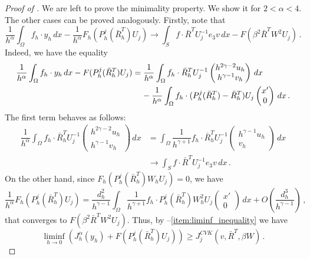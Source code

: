 \documentclass{article}
\theoremstyle{plain}
\theoremstyle{plain}
\theoremstyle{plain}
\theoremstyle{plain}
\theoremstyle{plain}
\theoremstyle{definition}
\theoremstyle{definition}
\begin{document}
\begin{proof}[Proof of ]
	We are left to prove the minimality property. We show it for $2 < \alpha < 4$. The other cases can be proved analogously. Firstly, note that 
	\begin{equation}\label{eq:convergence_force_term}
		\dfrac{1}{h^\alpha}\int_\Omega f_h \cdot y_h \, dx - \dfrac{1}{h^\alpha}F_h(P_h^j(\bar R_h^T)U_j) \to \int_S f \cdot \bar R^T U_j^{-1} e_3 v \, dx - F(\beta^2\bar R^TW^2U_j) \,.
	\end{equation}
	Indeed, we have the equality
	\begin{equation}
		\begin{aligned}
			\dfrac{1}{h^\alpha}\int_\Omega f_h \cdot y_h \, dx - F(P_h^j(\bar R_h^T)U_j) & = \dfrac{1}{h^\alpha} \int_\Omega f_h \cdot \bar R_h^TU_j^{-1}\begin{pmatrix}
			h^{2\gamma - 2}u_h \\ h^{\gamma - 1} v_h
			\end{pmatrix} \, dx\\
			& \hphantom{=} \, \, - \dfrac{1}{h^\alpha} \int_\Omega f_h \cdot (P_h^j(\bar R_h^T) - \bar R_h^T)U_j\begin{pmatrix}
			x' \\ 0
			\end{pmatrix} \, dx \,.
		\end{aligned}
	\end{equation}
	The first term behaves as follows:
	\begin{align}
		\dfrac{1}{h^\alpha} \int_\Omega f_h \cdot \bar R_h^TU_j^{-1}\begin{pmatrix}
		h^{2\gamma - 2}u_h \\ h^{\gamma - 1} v_h
		\end{pmatrix} \, dx & = \int_\Omega \dfrac{1}{h^{\gamma+1}} f_h \cdot \bar R_h^TU_j^{-1}\begin{pmatrix}
		h^{\gamma - 1}u_h \\ v_h
		\end{pmatrix} \, dx \\
		& \to  \int_S f \cdot \bar R^T U_j^{-1} e_3 v \, dx \,.
	\end{align}
	On the other hand, since $F_h(P_h^j(\bar R_h^T)W_h U_j) = 0$, we have
	\begin{equation}
		\dfrac{1}{h^\alpha}F_h(P_h^j(\bar R_h^T)U_j) = \dfrac{d_h^2}{h^{\gamma - 1}}\int_\Omega \dfrac{1}{h^{\gamma + 1}}f_h \cdot P_h^j(\bar R_h^T) W_h^2 U_j \begin{pmatrix}
			x' \\ 0
		\end{pmatrix} \, dx + O\left(\dfrac{d_h^3}{h^{\gamma-1}}\right) \,,
	\end{equation}
	that converges to $F(\beta^2 \bar R^T W^2 U_j)$. Thus, by --\ref{item:liminf_inequality} we have
	\begin{equation}\label{eq:liminf_inequality_forces}
		\liminf_{h \to 0} (J_h^\alpha(y_h) + F(P_h^j(\bar R_h^T)U_j)) \geq J_j^{CVK}(v, \bar R^T, \beta W) \,.
	\end{equation}


\end{proof}
\end{document}
